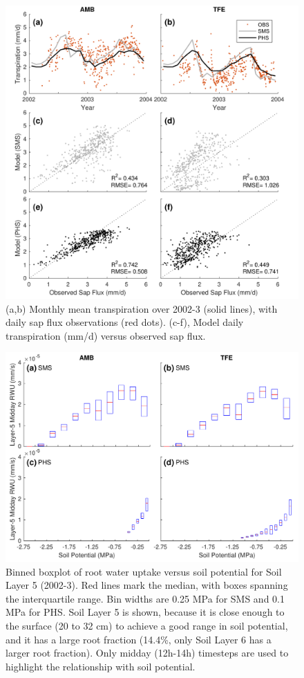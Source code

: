 \documentclass[draft,linenumbers]{agujournal}
\begin{document}
  \clearpage   
  \begin{figure}[h]
     \centering
     \includegraphics[width=30pc]{../figs3/T.pdf}
     \caption{(a,b) Monthly mean transpiration over 2002-3 (solid lines), with daily sap flux observations (red dots).
     (c-f), Model daily transpiration (mm/d) versus observed sap flux.
     }
     \label{fig:t}
  \end{figure}

  \begin{figure}[h]
     \centering
     \includegraphics[width=30pc]{../figs3/rwu.pdf}
     \caption{Binned boxplot of root water uptake versus soil potential for Soil Layer 5 (2002-3).
     Red lines mark the median, with boxes spanning the interquartile range.
     Bin widths are 0.25 MPa for SMS and 0.1 MPa for PHS.
     Soil Layer 5 is shown, because it is close enough to the surface (20 to 32 cm) to achieve a good range in soil potential, and it has a large root fraction (14.4\%, only Soil Layer 6 has a larger root fraction).
     Only midday (12h-14h) timesteps are used to highlight the relationship with soil potential.}
     \label{fig:rwu}
  \end{figure}
  \clearpage
  
\end{document}
